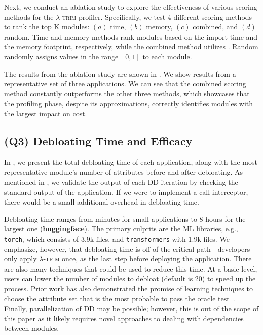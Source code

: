 \documentclass[sigplan,screen]{acmart}
\newcommand{\sys}{\textsc{\ensuremath{\lambda}-trim}\xspace}
\newcommand{\application}[1]{{\textcolor{pennblue}{\textbf{#1}}}}
\newcommand{\module}[1]{{\texttt{#1}}}
\begin{document}
Next, we conduct an ablation study to explore the effectiveness of various scoring methods for the \sys profiler.
Specifically, we test 4 different scoring methods to rank the top K modules: $(a)$ time, $(b)$ memory, $(c)$ combined, and $(d)$ random.
Time and memory methods rank modules based on the import time and the memory footprint, respectively, while the combined method utilizes .
Random randomly assigns values in the range $[0,1]$ to each module.


The results from the ablation study are shown in .
We show results from a representative set of three applications.
We can see that the combined scoring method constantly outperforms the other three methods, which showcases that the profiling phase, despite its approximations, correctly identifies modules with the largest impact on cost.


%
 



%
 
\subsection{(Q3) Debloating Time and Efficacy}



In , we present the total debloating time of each application, along with the most representative module's number of attributes before and after debloating.
As mentioned in , we validate the output of each DD iteration by checking the standard output of the application.
If we were to implement a call interceptor, there would be a small additional overhead in debloating time.

Debloating time ranges from minutes for small applications to 8 hours for the largest one (\application{huggingface}).
The primary culprits are the ML libraries, e.g., \module{torch}, which consists of 3.9k files, and \module{transformers} with 1.9k files.
We emphasize, however, that debloating time is off of the critical path---developers only apply \sys once, as the last step before deploying the application.
There are also many techniques that could be used to reduce this time.
At a basic level, users can lower the number of modules to debloat (default is 20) to speed up the process.
Prior work has also demonstrated the promise of learning techniques to choose the attribute set that is the most probable to pass the oracle test~\cite{deltarl2018}.
Finally, parallelization of DD may be possible; however, this is out of the scope of this paper as it likely requires novel approaches to dealing with dependencies between modules.
\end{document}

